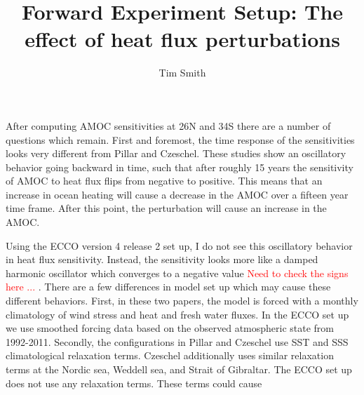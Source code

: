 \documentclass[a4paper,11pt]{article}
\title{\vspace{-10ex}Forward Experiment Setup: The effect of heat flux perturbations}
\author{Tim Smith}
\date{\vspace{-3ex}}
\newcommand{\red}[1]{\textcolor{red}{#1}}
\begin{document}
After computing AMOC sensitivities at 26N and 34S there are a number of questions which remain. First and foremost, the time response of the sensitivities looks very different from Pillar and Czeschel. These studies show an oscillatory behavior going backward in time, such that after roughly 15 years the sensitivity of AMOC to heat flux flips from negative to positive. This means that an increase in ocean heating will cause a decrease in the AMOC over a fifteen year time frame. After this point, the perturbation will cause an increase in the AMOC. 

Using the ECCO version 4 release 2 set up, I do not see this oscillatory behavior in heat flux sensitivity. Instead, the sensitivity looks more like a damped harmonic oscillator which converges to a negative value \red{Need to check the signs here ... }. There are a few differences in model set up which may cause these different behaviors. First, in these two papers, the model is forced with a monthly climatology of wind stress and heat and fresh water fluxes. In the ECCO set up we use smoothed forcing data based on the observed atmospheric state from 1992-2011. Secondly, the configurations in Pillar and Czeschel use SST and SSS climatological relaxation terms. Czeschel additionally uses similar relaxation terms at the Nordic sea, Weddell sea, and Strait of Gibraltar. The ECCO set up does not use any relaxation terms. These terms could cause 
\end{document}
